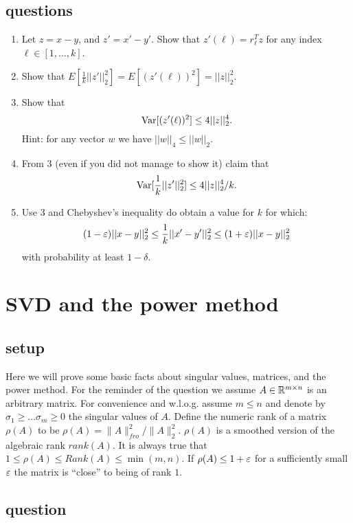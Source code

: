 \subsection*{questions}
\begin{enumerate}
\item Let $z = x-y$, and $z' = x' - y'$. Show that $z'(\ell) =
r_{\ell}^{T}z$ for any index $\ell \in [1,\ldots,k]$.

\item Show that $E[\frac{1}{k}||z'||_{2}^{2}] = E[(z'(\ell))^2] = ||z||_{2}^{2}$.
\item Show that
\[
{\operatorname{Var}}[(z'(\ell))^2] \le 4||z||_{2}^{4}.
\]
Hint: for any vector $w$ we have $||w||_4 \le ||w||_2$.
\item From 3 (even if you did not manage to show it) claim that
\[
{\operatorname{Var}}[\frac{1}{k}||z'||_{2}^{2}] \le 4||z||_{2}^{4}/k.
\]
\item Use 3 and Chebyshev's inequality do obtain a value for $k$
for which:
\[
(1-\varepsilon)||x-y||_{2}^{2} \le \frac{1}{k}||x' -y'||_{2}^{2} \le
(1+\varepsilon)||x-y||_{2}^{2}
\]
with probability at least $1-\delta$.
\end{enumerate}

\pagebreak

\section{SVD and the power method}
\subsection*{setup}

Here we will prove some basic facts about singular values, matrices, and the power method.
For the reminder of the question we assume $A \in {\mathbb{R}}^{m \times n}$ is an arbitrary matrix.
For convenience and w.l.o.g. assume $m \le n$ and denote by $\sigma_1 \ge \ldots \sigma_m \ge 0$
the singular values of $A$.
Define the numeric rank of a matrix $\rho(A)$ to be $\rho(A) = \|A\|^{2}_{fro}/\|A\|^2_2$. $\rho(A)$ is a smoothed
version of the algebraic rank $rank(A)$. It is always true that $1\le \rho(A) \le Rank(A) \le \min(m,n)$.
If $\rho(A) \le 1 +\varepsilon$ for a sufficiently small $\varepsilon$ the matrix is ``close'' to being of rank $1$.

\subsection*{question}


